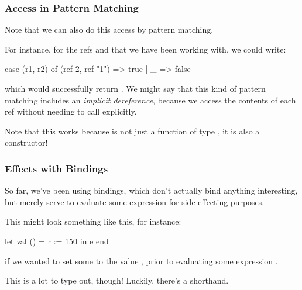 \documentclass[aspectratio=169]{beamer}
\begin{document}
\begin{frame}[fragile]
  \frametitle{ Access in Pattern Matching}

  Note that we can also do this \code{!} access by pattern matching.

  \pause
  \vspace{\fill}

  For instance, for the refs  and 
  that we have been working with, we could write:
  \begin{codeblock}
    case (r1, r2) of
      (ref 2, ref "1") => true
    | _ => false
  \end{codeblock}
  which would successfully return . We might say that this kind
  of pattern matching includes an \textit{implicit dereference}, because we
  access the contents of each ref without needing to call \code{!} explicitly.

  \pause
  \vspace{\fill}

  Note that this works because  is not just a function of type
  , it is also a constructor!
\end{frame}

\begin{frame}[fragile]
  \frametitle{Effects with Bindings}

  So far, we've been using  bindings, which don't actually bind
  anything interesting, but merely serve to evaluate some expression for
  side-effecting purposes.

  \pause
  \vspace{\fill}

  This might look something like this, for instance:
  \begin{codeblock}
    let
      val () = r := 150
    in
      e
    end
  \end{codeblock}

  if we wanted to set some  to the value , prior to
  evaluating some expression .

  \pause
  \vspace{\fill}

  This is a lot to type out, though! Luckily, there's a shorthand.

\end{frame}
\end{document}
